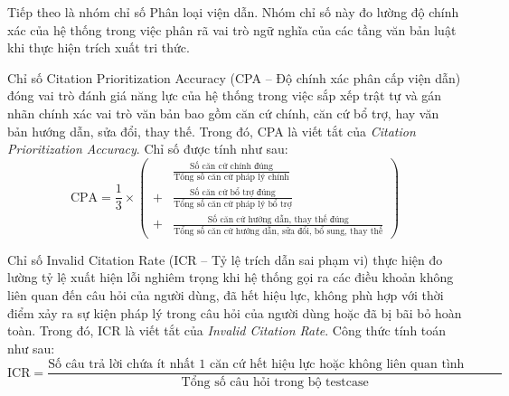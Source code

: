 \documentclass[../DoAn.tex]{subfiles}
\begin{document}
Tiếp theo là nhóm chỉ số Phân loại viện dẫn. Nhóm chỉ số này đo lường độ chính xác của hệ thống trong việc phân rã vai trò ngữ nghĩa của các tầng văn bản luật khi thực hiện trích xuất tri thức.

Chỉ số Citation Prioritization Accuracy (CPA -- Độ chính xác phân cấp viện dẫn) đóng vai trò đánh giá năng lực của hệ thống trong việc sắp xếp trật tự và gán nhãn chính xác vai trò văn bản bao gồm căn cứ chính, căn cứ bổ trợ, hay văn bản hướng dẫn, sửa đổi, thay thế. Trong đó, CPA là viết tắt của \textit{Citation Prioritization Accuracy}. Chỉ số được tính như sau: 
\begin{equation}
\label{eq:cpa_metric}
\text{CPA} = \frac{1}{3} \times \left( \begin{aligned}
    &\frac{\text{Số căn cứ chính đúng}}{\text{Tổng số căn cứ pháp lý chính}} \\
    + &\frac{\text{Số căn cứ bổ trợ đúng}}{\text{Tổng số căn cứ pháp lý bổ trợ}} \\
    + &\frac{\text{Số căn cứ hướng dẫn, thay thế đúng}}{\text{Tổng số căn cứ hướng dẫn, sửa đổi, bổ sung, thay thế}}
\end{aligned} \right)
\end{equation}

Chỉ số Invalid Citation Rate (ICR -- Tỷ lệ trích dẫn sai phạm vi) thực hiện đo lường tỷ lệ xuất hiện lỗi nghiêm trọng khi hệ thống gọi ra các điều khoản không liên quan đến câu hỏi của người dùng, đã hết hiệu lực, không phù hợp với thời điểm xảy ra sự kiện pháp lý trong câu hỏi của người dùng hoặc đã bị bãi bỏ hoàn toàn. Trong đó, ICR là viết tắt của \textit{Invalid Citation Rate}. Công thức tính toán như sau:
\begin{equation}
\label{eq:icr_metric}
\text{ICR} = \frac{\text{Số câu trả lời chứa ít nhất 1 căn cứ hết hiệu lực hoặc không liên quan tình huống}}{\text{Tổng số câu hỏi trong bộ testcase}}
\end{equation}
\end{document}
